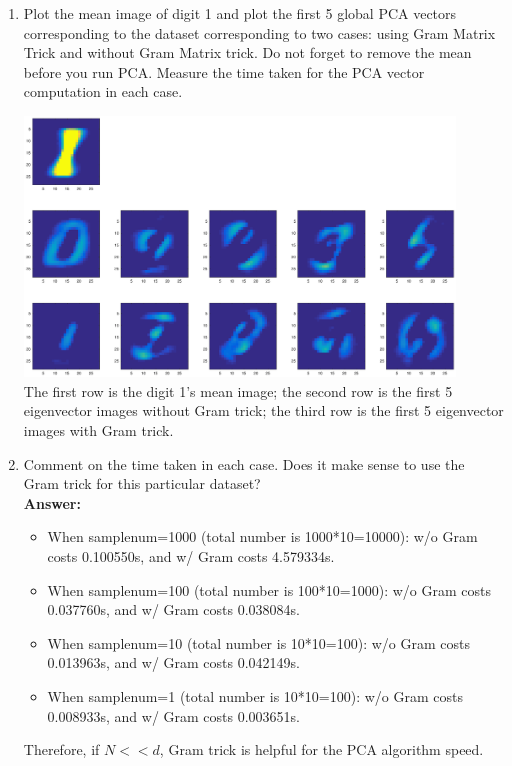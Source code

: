 \documentclass[letterpaper,10pt]{article}
\begin{document}
\begin{enumerate}
	\item Plot the mean image of digit 1 and plot the first 5 global PCA vectors
	corresponding to the dataset corresponding to two cases: using Gram
	Matrix Trick and without Gram Matrix trick. Do not forget to remove
	the mean before you run PCA. Measure the time taken for the PCA vector
	computation in each case.\\
	
	\begin{center}
	\includegraphics[width=0.9\textwidth]{./matlab/digit_1.eps}\\
	The first row is the digit 1's mean image; the second row is the first 5 eigenvector images without Gram trick; the third row is the first 5 eigenvector images with Gram trick.
	\end{center}
	
	\item Comment on the time taken in each case. Does it make sense to use the
	Gram trick for this particular dataset?\\
	\textbf{Answer:}
	\begin{itemize}
		\item When samplenum=1000 (total number is 1000*10=10000): w/o Gram costs 0.100550s, and w/ Gram costs 4.579334s.
		\item When samplenum=100 (total number is 100*10=1000): w/o Gram costs 0.037760s, and w/ Gram costs 0.038084s.
		\item When samplenum=10 (total number is 10*10=100): w/o Gram costs 0.013963s, and w/ Gram costs 0.042149s.
		\item When samplenum=1 (total number is 10*10=100): w/o Gram costs 0.008933s, and w/ Gram costs 0.003651s.
	\end{itemize}
	Therefore, if $N<<d$, Gram trick is helpful for the PCA algorithm speed.
	

\end{enumerate}
\end{document}
